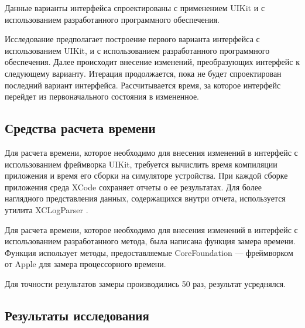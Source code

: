 Данные варианты интерфейса спроектированы с применением UIKit и с использованием разработанного программного обеспечения.


Исследование предполагает построение первого варианта интерфейса с использованием UIKit, и с использованием разработанного программного обеспечения.
Далее происходит внесение изменений, преобразующих интерфейс к следующему варианту.
Итерация продолжается, пока не будет спроектирован последний вариант интерфейса.
Рассчитывается время, за которое интерфейс перейдет из первоначального состояния в измененное. 

\subsection{Средства расчета времени}

Для расчета времени, которое необходимо для внесения изменений в интерфейс с использованием фреймворка UIKit, требуется вычислить время компиляции приложения и время его сборки на симуляторе устройства.
При каждой сборке приложения среда XCode сохраняет отчеты о ее результатах.
Для более наглядного представления данных, содержащихся внутри отчета, используется утилита XCLogParser \cite{log}.

Для расчета времени, которое необходимо для внесения изменений в интерфейс с использованием разработанного метода, была написана функция замера времени. 
Функция использует методы, предоставляемые CoreFoundation \cite{corefoundation} ---  фреймворком от Apple для замера процессорного времени.

Для точности результатов замеры производились 50 раз, результат усреднялся.

\subsection{Результаты исследования}

